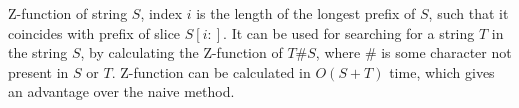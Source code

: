 Z-function of string $S$, index $i$ is the length of the longest prefix of $S$, such that it coincides with prefix of slice $S[i:]$. It can be used for searching for a string $T$ in the string $S$, by calculating the Z-function of $T\#S$, where $\#$ is some character not present in $S$ or $T$. Z-function can be calculated in $O(S + T)$ time, which gives an advantage over the naive method.


